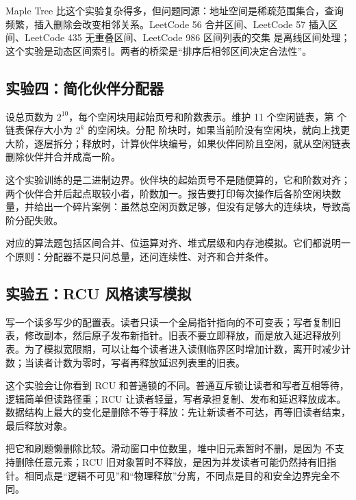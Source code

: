 Maple Tree 比这个实验复杂得多，但问题同源：地址空间是稀疏范围集合，查询频繁，插入删除会改变相邻关系。LeetCode 56 合并区间、LeetCode 57 插入区间、LeetCode 435 无重叠区间、LeetCode 986 区间列表的交集 是离线区间处理；这个实验是动态区间索引。两者的桥梁是“排序后相邻区间决定合法性”。

\subsection{实验四：简化伙伴分配器}

设总页数为 \ensuremath{2^{10}}，每个空闲块用起始页号和阶数表示。维护 11 个空闲链表，第  个链表保存大小为 \ensuremath{2^k} 的空闲块。分配  阶块时，如果当前阶没有空闲块，就向上找更大阶，逐层拆分；释放时，计算伙伴块编号，如果伙伴同阶且空闲，就从空闲链表删除伙伴并合并成高一阶。

这个实验训练的是二进制边界。伙伴块的起始页号不是随便算的，它和阶数对齐；两个伙伴合并后起点取较小者，阶数加一。报告要打印每次操作后各阶空闲块数量，并给出一个碎片案例：虽然总空闲页数足够，但没有足够大的连续块，导致高阶分配失败。

对应的算法题包括区间合并、位运算对齐、堆式层级和内存池模拟。它们都说明一个原则：分配器不是只问总量，还问连续性、对齐和合并条件。

\subsection{实验五：RCU 风格读写模拟}

写一个读多写少的配置表。读者只读一个全局指针指向的不可变表；写者复制旧表，修改副本，然后原子发布新指针。旧表不要立即释放，而是放入延迟释放列表。为了模拟宽限期，可以让每个读者进入读侧临界区时增加计数，离开时减少计数；当读者计数为零时，写者再释放延迟列表里的旧表。

这个实验会让你看到 RCU 和普通锁的不同。普通互斥锁让读者和写者互相等待，逻辑简单但读路径重；RCU 让读者轻量，写者承担复制、发布和延迟释放成本。数据结构上最大的变化是删除不等于释放：先让新读者不可达，再等旧读者结束，最后释放对象。

把它和刷题懒删除比较。滑动窗口中位数里，堆中旧元素暂时不删，是因为  不支持删除任意元素；RCU 旧对象暂时不释放，是因为并发读者可能仍然持有旧指针。相同点是“逻辑不可见”和“物理释放”分离，不同点是目的和安全边界完全不同。



